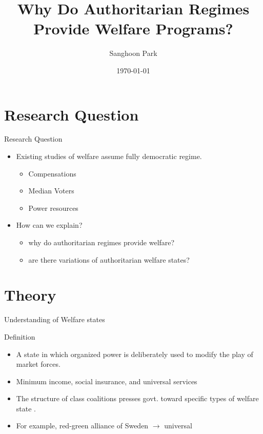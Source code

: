 \documentclass{Bredelebeamer}
\title{Why Do Authoritarian Regimes Provide Welfare Programs?}
\author{Sanghoon Park \inst{1}}
\institute[University of South Carolina]
{
  \inst{1}%
  University of South Carolina\\Department of Political Science}
\date{\today}
\begin{document}
\begin{frame}
\titlepage
\end{frame}

\section{Research Question}
\begin{frame}[t]{Research Question}
	\begin{itemize}
		\item Existing studies of welfare assume fully democratic regime.\pause
		\begin{itemize}
			\item Compensations %
			\item Median Voters %
			\item Power resources %
		\end{itemize}\pause
		\item How can we explain?
		\begin{itemize}
			\item why do authoritarian regimes provide welfare?
			\item are there variations of authoritarian welfare states?
		\end{itemize}
	\end{itemize}	
\end{frame}

\section{Theory}
\begin{frame}{Understanding of Welfare states}
\begin{alertblock}{Definition}
	\begin{itemize}
		\item A state in which organized power is deliberately used to modify the play of market forces.
		\item Minimum income, social insurance, and universal services
	\end{itemize}
\end{alertblock}
\begin{itemize}
	\item The structure of class coalitions presses govt. toward specific types of welfare state \citep{Gosta1990}.
	\item For example, red-green alliance of Sweden $\rightarrow$ universal %
\end{itemize}
\end{frame}
\end{document}
